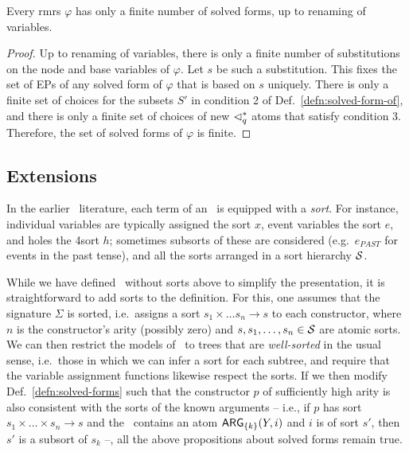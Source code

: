 \begin{prop}
  Every {\sc rmrs} $\varphi$ has only a finite number of solved forms, up to
  renaming of variables.
\end{prop}
\begin{proof}
  Up to renaming of variables, there is only a finite number of
  substitutions on the node and base variables of $\varphi$.  Let $s$
  be such a substitution.  This fixes the set of EPs of any solved
  form of $\varphi$ that is based on $s$ uniquely.  There is only a
  finite set of choices for the subsets $S'$ in condition 2 of
  Def.~\ref{defn:solved-form-of}, and there is only a finite set of
  choices of new $\lhd^*_q$ atoms that satisfy condition 3.  Therefore,
  the set of solved forms of $\varphi$ is finite.
\end{proof}




\subsection{Extensions}

In the earlier \rmrs\ literature, each term of an \rmrs\ is equipped
with a \emph{sort}.  For instance, individual variables are typically
assigned the sort $x$, event variables the sort $e$, and holes the
4sort $h$; sometimes subsorts of these are considered (e.g.\ $e_{PAST}$
for events in the past tense), and all the sorts arranged in a sort
hierarchy ${\cal S}$.

While we have defined \rmrs\ without sorts above to simplify the
presentation, it is straightforward to add sorts to the definition.
For this, one assumes that the signature $\Sigma$ is sorted, i.e.\
assigns a sort $s_1\times\ldots s_n\rightarrow s$ to each constructor,
where $n$ is the constructor's arity (possibly zero) and
$s,s_1,\ldots,s_n\in {\cal S}$ are atomic sorts.  We can then
restrict the models of \rmrs\ to trees that are \emph{well-sorted} in
the usual sense, i.e.\ those in which we can infer a sort for each
subtree, and require that the variable assignment functions likewise
respect the sorts.  If we then modify Def.~\ref{defn:solved-forms}
such that the constructor $p$ of sufficiently high arity is also
consistent with the sorts of the known arguments -- i.e., if $p$ has
sort $s_1 \times \ldots \times s_n \rightarrow s$ and the \rmrs\
contains an atom $\mathsf{ARG}_{\{k\}}(Y,i)$ and $i$ is of sort $s'$, then
$s'$ is a subsort of $s_k$ --, all the above propositions about solved
forms remain true.

